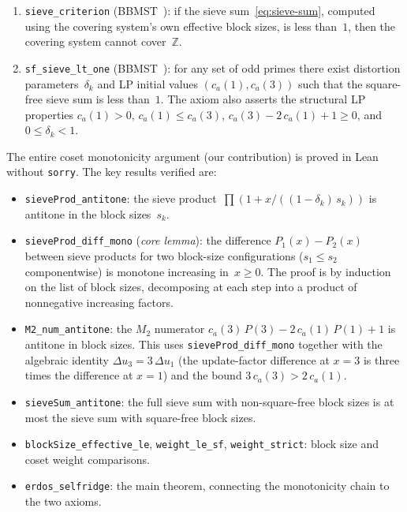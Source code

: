 \documentclass[11pt]{amsart}
\theoremstyle{definition}
\theoremstyle{remark}
\begin{document}
\begin{enumerate}
\item \texttt{sieve\_criterion}
      (BBMST~\cite[Theorems~3.1 and~3.2]{BBMST2019}):
      if the sieve sum~\eqref{eq:sieve-sum}, computed using the
      covering system's own effective block sizes, is less than~$1$,
      then the covering system cannot cover~$\mathbb{Z}$.

\item \texttt{sf\_sieve\_lt\_one}
      (BBMST~\cite[Theorem~1.1]{BBMST2019}):
      for any set of odd primes there exist distortion
      parameters~$\delta_k$ and LP initial values $(c_a(1), c_a(3))$
      such that the square-free sieve sum is less than~$1$.
      The axiom also asserts the structural LP properties
      $c_a(1) > 0$, $c_a(1) \le c_a(3)$,
      $c_a(3) - 2\,c_a(1) + 1 \ge 0$, and
      $0 \le \delta_k < 1$.
\end{enumerate}

\noindent
The entire coset monotonicity argument (our contribution) is
proved in Lean without \texttt{sorry}.
The key results verified are:

\begin{itemize}
\item \texttt{sieveProd\_antitone}:
      the sieve product~$\prod(1 + x/((1-\delta_k)\,s_k))$ is
      antitone in the block sizes~$s_k$.

\item \texttt{sieveProd\_diff\_mono} (\emph{core lemma}):
      the difference $P_1(x) - P_2(x)$ between sieve products for
      two block-size configurations ($s_1 \le s_2$ componentwise)
      is monotone increasing in~$x \ge 0$.
      The proof is by induction on the list of block sizes,
      decomposing at each step into a product of nonnegative
      increasing factors.

\item \texttt{M2\_num\_antitone}:
      the $M_2$ numerator $c_a(3)\,P(3) - 2\,c_a(1)\,P(1) + 1$
      is antitone in block sizes.
      This uses \texttt{sieveProd\_diff\_mono} together with
      the algebraic identity
      $\Delta u_3 = 3\,\Delta u_1$
      (the update-factor difference at $x = 3$ is three times
      the difference at $x = 1$) and the bound
      $3\,c_a(3) > 2\,c_a(1)$.

\item \texttt{sieveSum\_antitone}:
      the full sieve sum with non-square-free block sizes is
      at most the sieve sum with square-free block sizes.

\item \texttt{blockSize\_effective\_le}, \texttt{weight\_le\_sf},
      \texttt{weight\_strict}:
      block size and coset weight comparisons.

\item \texttt{erdos\_selfridge}:
      the main theorem, connecting the monotonicity chain
      to the two axioms.
\end{itemize}
\end{document}
